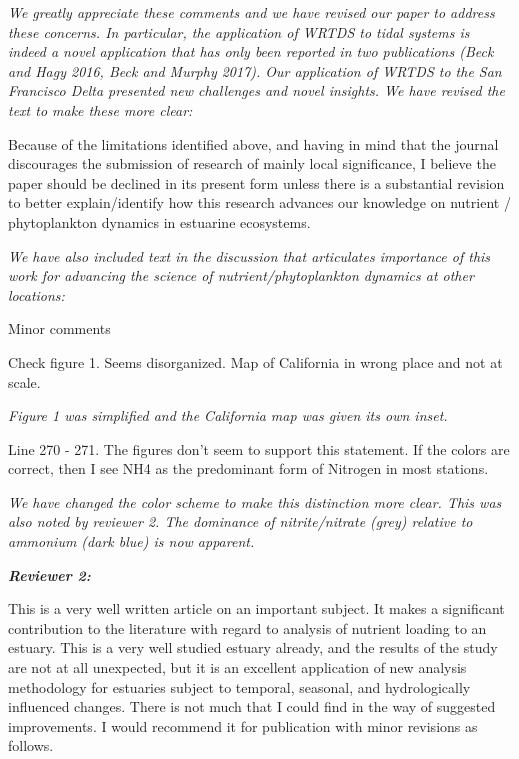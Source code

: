 \documentclass[letterpaper,12pt]{article}
\newcommand{\Bigtxt}[1]{\textbf{\textit{#1}}}
\begin{document}
{\it We greatly appreciate these comments and we have revised our paper to address these concerns.  In particular, the application of WRTDS to tidal systems is indeed a novel application that has only been reported in two publications (Beck and Hagy 2016, Beck and Murphy 2017).  Our application of WRTDS to the San Francisco Delta presented new challenges and novel insights.  We have revised the text to make these more clear:

}

Because of the limitations identified above, and having in mind that the journal discourages the submission of research of mainly local significance, I believe the paper should be declined in its present form unless there is a substantial revision to better explain/identify how this research advances our knowledge on nutrient / phytoplankton dynamics in estuarine ecosystems. 

{\it We have also included text in the discussion that articulates importance of this work for advancing the science of nutrient/phytoplankton dynamics at other locations:

}

Minor comments

Check figure 1. Seems disorganized. Map of California in wrong place and not at scale.

{\it Figure 1 was simplified and the California map was given its own inset.}

Line  270 - 271. The figures don't seem to support this statement. If the colors are correct, then I see NH4 as the predominant form of Nitrogen in most stations. 

{\it We have changed the color scheme to make this distinction more clear.  This was also noted by reviewer 2.  The dominance of nitrite/nitrate (grey) relative to ammonium (dark blue) is now apparent.}


\Bigtxt{Reviewer 2:}

This is a very well written article on an important subject.  It makes a significant contribution to the literature with regard to analysis of nutrient loading to an estuary.  This is a very well studied estuary already, and the results of the study are not at all unexpected, but it is an excellent application of new analysis methodology for estuaries subject to temporal, seasonal, and hydrologically influenced changes.  There is not much that I could find in the way of suggested improvements.  I would recommend it for publication with minor revisions as follows.
\end{document}
